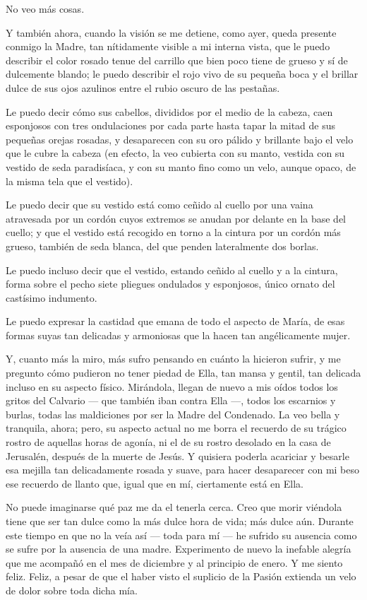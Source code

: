 \documentclass[12pt]{book} %
\begin{document}
No veo más cosas. 

Y también ahora, cuando la visión se me detiene, como ayer, queda presente conmigo la Madre, tan nítidamente visible a mi interna vista, que le puedo describir el color rosado tenue del carrillo que bien poco tiene de grueso y sí de dulcemente blando; le puedo describir el rojo vivo de su pequeña boca y el brillar dulce de sus ojos azulinos entre el rubio oscuro de las pestañas. 

Le puedo decir cómo sus cabellos, divididos por el medio de la cabeza, caen esponjosos con tres ondulaciones por cada parte hasta tapar la mitad de sus pequeñas orejas rosadas, y desaparecen con su oro pálido y brillante bajo el velo que le cubre la cabeza (en efecto, la veo cubierta con su manto, vestida con su vestido de seda paradisíaca, y con su manto fino como un velo, aunque opaco, de la misma tela que el vestido). 

Le puedo decir que su vestido está como ceñido al cuello por una vaina atravesada por un cordón cuyos extremos se anudan por delante en la base del cuello; y que el vestido está recogido en torno a la cintura por un cordón más grueso, también de seda blanca, del que penden lateralmente dos borlas. 

Le puedo incluso decir que el vestido, estando ceñido al cuello y a la cintura, forma sobre el pecho siete pliegues ondulados y esponjosos, único ornato del castísimo indumento. 

Le puedo expresar la castidad que emana de todo el aspecto de María, de esas formas suyas tan delicadas y armoniosas que la hacen tan angélicamente mujer. 

Y, cuanto más la miro, más sufro pensando en cuánto la hicieron sufrir, y me pregunto cómo pudieron no tener piedad de Ella, tan mansa y gentil, tan delicada incluso en su aspecto físico. Mirándola, llegan de nuevo a mis oídos todos los gritos del Calvario — que también iban contra Ella —, todos los escarnios y burlas, todas las maldiciones por ser la Madre del Condenado. La veo bella y tranquila, ahora; pero, su aspecto actual no me borra el recuerdo de su trágico rostro de aquellas horas de agonía, ni el de su rostro desolado en la casa de Jerusalén, después de la muerte de Jesús. Y quisiera poderla acariciar y besarle esa mejilla tan delicadamente rosada y suave, para hacer desaparecer con mi beso ese recuerdo de llanto que, igual que en mí, ciertamente está en Ella. 

No puede imaginarse qué paz me da el tenerla cerca. Creo que morir viéndola tiene que ser tan dulce como la más dulce hora de vida; más dulce aún. Durante este tiempo en que no la veía así — toda para mí — he sufrido su ausencia como se sufre por la ausencia de una madre. Experimento de nuevo la inefable alegría que me acompañó en el mes de diciembre y al principio de enero. Y me siento feliz. Feliz, a pesar de que el haber visto el suplicio de la Pasión extienda un velo de dolor sobre toda dicha mía. 
\end{document}

